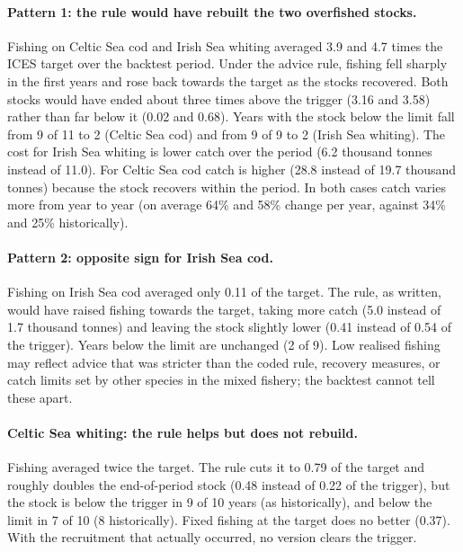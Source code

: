 \documentclass[11pt,a4paper]{article}
\begin{document}
\paragraph{Pattern 1: the rule would have rebuilt the two overfished stocks.}
Fishing on Celtic Sea cod and Irish Sea whiting averaged 3.9 and 4.7 times
the ICES target over the backtest period. Under the advice rule, fishing
fell sharply in the first years and rose back towards the target as the
stocks recovered. Both stocks would have ended about three times above the
trigger (3.16 and 3.58) rather than far below it (0.02 and 0.68). Years
with the stock below the limit fall from 9 of 11 to 2 (Celtic Sea cod) and
from 9 of 9 to 2 (Irish Sea whiting). The cost for Irish Sea whiting is
lower catch over the period (6.2 thousand tonnes instead of 11.0). For
Celtic Sea cod catch is higher (28.8 instead of 19.7 thousand tonnes)
because the stock recovers within the period. In both cases catch varies
more from year to year (on average 64\% and 58\% change per year, against
34\% and 25\% historically).

\paragraph{Pattern 2: opposite sign for Irish Sea cod.} Fishing on Irish Sea
cod averaged only 0.11 of the target. The rule, as written, would have
raised fishing towards the target, taking more catch (5.0 instead of 1.7
thousand tonnes) and leaving the stock slightly lower (0.41 instead of
0.54 of the trigger). Years below the limit are unchanged (2 of 9).
Low realised fishing may reflect advice that was stricter than the coded
rule, recovery measures, or catch limits set by other species in the
mixed fishery; the backtest cannot tell these apart.

\paragraph{Celtic Sea whiting: the rule helps but does not rebuild.}
Fishing averaged twice the target. The rule cuts it to 0.79 of the target
and roughly doubles the end-of-period stock (0.48 instead of 0.22 of the
trigger), but the stock is below the trigger in 9 of 10 years (as
historically), and below the limit in 7 of 10 (8 historically). Fixed fishing at the target does
no better (0.37). With the recruitment that actually occurred, no version
clears the trigger.
\end{document}
